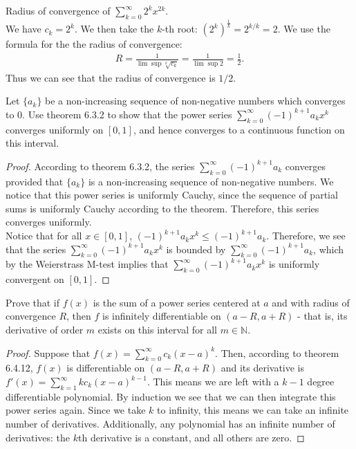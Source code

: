 \documentclass[12pt]{book}
\newcommand{\N}{\mathbb{N}}
\newenvironment{exercise}[2][Exercise]{\begin{trivlist}
\item[\hskip \labelsep {\bfseries #1}\hskip \labelsep {\bfseries #2.}]}{\end{trivlist}}
\begin{document}
\begin{exercise}{6.4.8}
Radius of convergence of $\sum_{k=0}^\infty 2^k x^{2k}$.  \\

We have $c_k= 2^k$. We then take the $k$-th root: $\left( 2^k \right)^{\frac{1}{k}} =2^{k/k} = 2$. We use the formula for the the radius of convergence: 
    \begin{align*}
      R = \frac{1}{\lim \sup \sqrt[k]{c_k}} = \frac{1}{\lim \sup 2} = \frac{1}{2}.
    \end{align*}
Thus we can see that the radius of convergence is $1/2$.
\end{exercise}



\begin{exercise}{6.4.10}
Let $\{a_k\}$ be a non-increasing sequence of non-negative numbers which converges to 0. Use theorem 6.3.2 to show that the power series $\sum_{k=0}^\infty (-1)^{k+1} a_k x^k$ converges uniformly on $[0,1]$, and hence converges to a continuous function on this interval.

    \begin{proof}
    According to theorem 6.3.2, the series $\sum_{k=0}^\infty \left(-1\right)^{k+1} a_k$ converges provided that $\{a_k\}$ is a non-increasing sequence of non-negative numbers. We notice that this power series is uniformly Cauchy, since the sequence of partial sums is uniformly Cauchy according to the theorem. Therefore, this series converges uniformly. \\
    Notice that for all $x \in [0,1]$, $\left(-1\right)^{k+1} a_k x^k \leq \left(-1\right)^{k+1} a_k$. Therefore, we see that the series $\sum_{k=0}^\infty (-1)^{k+1} a_k x^k$  is bounded by $\sum_{k=0}^\infty (-1)^{k+1} a_k$, which by the Weierstrass M-test implies that $\sum_{k=0}^\infty (-1)^{k+1} a_k x^k$  is uniformly convergent on $[0,1]$.
    \end{proof}
\end{exercise}



\begin{exercise}{6.4.12}
Prove that if $f(x)$ is the sum of a power series centered at $a$ and with radius of convergence $R$, then $f$ is infinitely differentiable on $(a-R,a+R)$ - that is, its derivative of order $m$ exists on this interval for all $m \in \N$.

   \begin{proof}
   Suppose that $f(x) = \sum_{k=0}^\infty c_k \left( x-a\right)^k$. Then, according to theorem 6.4.12, $f(x)$ is differentiable on $\left(a-R, a+R\right)$ and its derivative is $f'(x) = \sum_{k=1}^\infty k c_k \left( x-a\right)^{k-1} $. This means we are left with a $k-1$ degree differentiable polynomial. By induction we see that we can then integrate this power series again. Since we take $k$ to infinity, this means we can take an infinite number of derivatives. Additionally, any polynomial has an infinite number of derivatives: the $k$th derivative is a constant, and all others are zero.
   \end{proof}
\end{exercise}
\end{document}
